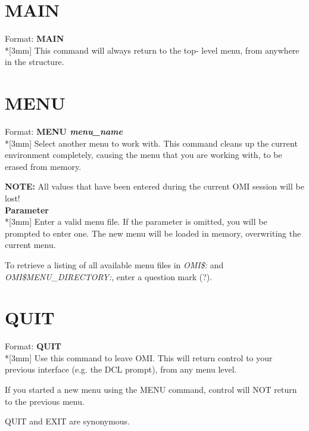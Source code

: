 \documentclass[a4paper]{book}
\newcommand{\vs}{\vspace{3mm}}
\renewcommand{\indent}{\hspace*{5mm}}
\begin{document}
\section{MAIN}
\label{subsec:mylabel17}

\indent Format: \textbf{MAIN}\dag\\*[3mm]
This command will always return to the top- level menu, from anywhere in the 
structure.

\section{MENU}
\label{subsec:mylabel18}

\indent Format: \textbf{MENU \textit{menu{\_}name}}\dag\\*[3mm]
Select another menu to work with. This command cleans up the current 
environment completely, causing the menu that you are working with, to be 
erased from memory.

\vs

\hspace{-8mm}\textbf{NOTE:} All values that have been entered during the current OMI 
session will be lost!\\[3mm]
\textbf{Parameter}\\*[3mm]
Enter a valid menu file. If the parameter is omitted, you will be prompted 
to enter one. The new menu will be loaded in memory, overwriting the current 
menu.

To retrieve a listing of all available menu files in \textsl{OMI{\$}:} and 
\linebreak\textsl{OMI{\$}MENU{\_}DIRECTORY:}, enter a 
question mark (\textsf{?}).

\section{QUIT}
\label{subsec:mylabel19}

\indent Format: \textbf{QUIT}\dag\\*[3mm]
Use this command to leave OMI. This will return control to your previous 
interface (e.g. the DCL prompt), from any menu level.

If you started a new menu using the \textsf{MENU} command, control will NOT return to 
the previous menu.

\vs

\textsf{QUIT} and \textsf{EXIT} are 
synonymous.
\end{document}
